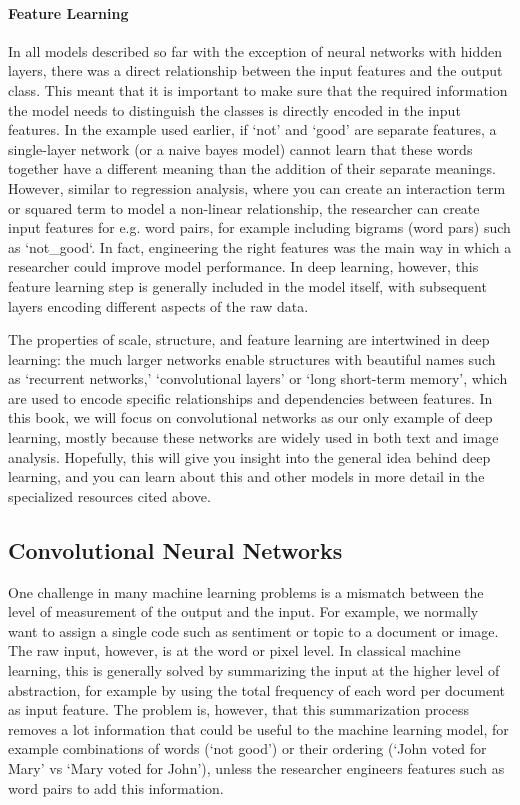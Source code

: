 \paragraph{Feature Learning}
In all models described so far with the exception of neural networks with hidden layers,
there was a direct relationship between the input features and the output class.
This meant that it is important to make sure that the required information the model needs to distinguish the classes
is directly encoded in the input features.
In the example used earlier, if `not' and `good' are separate features, a single-layer network (or a naive bayes model)
cannot learn that these words together have a different meaning than the addition of their separate meanings.
However, similar to regression analysis, where you can create an interaction term or squared term to model a non-linear relationship,
the researcher can create input features for e.g. word pairs, for example including bigrams (word pars) such as `not\_good`.
In fact, engineering the right features was the main way in which a researcher could improve model performance.
In deep learning, however, this feature learning step is generally included in the model itself,
with subsequent layers encoding different aspects of the raw data.

The properties of scale, structure, and feature learning are intertwined in deep learning: the much larger networks enable structures with beautiful names such as `recurrent networks,' `convolutional layers' or `long short-term memory',
which are used to encode specific relationships and dependencies between features.
In this book, we will focus on convolutional networks as our only example of deep learning,
mostly because these networks are widely used in both text and image analysis.
Hopefully, this will give you insight into the general idea behind deep learning,
and you can learn about this and other models in more detail in the specialized resources cited above.  

\subsection{Convolutional Neural Networks}

One challenge in many machine learning problems is a mismatch between the level of measurement of the output and the input.
For example, we normally want to  assign a single code such as sentiment or topic to a document or image.
The raw input, however, is at the word or pixel level.
In classical machine learning, this is generally solved by summarizing the input at the higher level of abstraction,
for example by using the total frequency of each word per document as input feature.
The problem is, however, that this summarization process removes a lot information that could be useful to the machine learning model,
for example combinations of words (`not good') or their ordering (`John voted for Mary' vs `Mary voted for John'),
unless the researcher engineers features such as word pairs to add this information.


